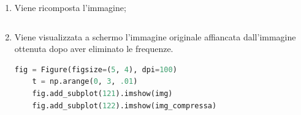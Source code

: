 \documentclass[preprint,12pt]{elsarticle}
\begin{document}
\begin{enumerate}
\item Viene ricomposta l'immagine;
\begin{lstlisting}[language=Python]

\end{lstlisting}

\item Viene visualizzata a schermo l'immagine originale affiancata dall'immagine ottenuta dopo aver eliminato le frequenze.
\begin{lstlisting}[language=Python]    
    fig = Figure(figsize=(5, 4), dpi=100)
    t = np.arange(0, 3, .01)
    fig.add_subplot(121).imshow(img)
    fig.add_subplot(122).imshow(img_compressa)
\end{lstlisting}

\end{enumerate}
\end{document}
